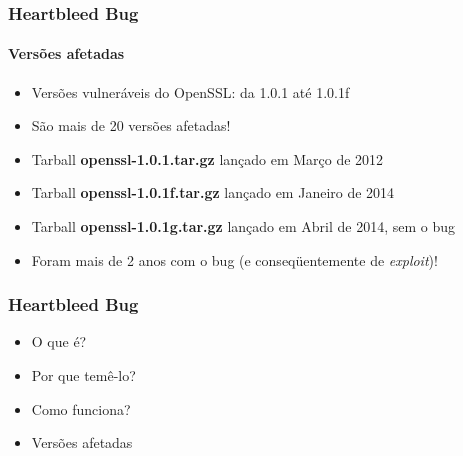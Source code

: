 \documentclass{beamer}
\begin{document}
\begin{frame}
	\frametitle{Heartbleed Bug}
	\framesubtitle{Versões afetadas}
	\begin{itemize}
		\item Versões vulneráveis do OpenSSL: da 1.0.1 até 1.0.1f
		\item São mais de 20 versões afetadas!
		\item Tarball \textbf{\textcolor{filecolor}{openssl-1.0.1.tar.gz}} lançado em Março de 2012
		\item Tarball \textbf{\textcolor{filecolor}{openssl-1.0.1f.tar.gz}} lançado em Janeiro de 2014
		\item Tarball \textbf{\textcolor{filecolor}{openssl-1.0.1g.tar.gz}} lançado em Abril de 2014, sem o bug
		\item Foram mais de 2 anos com o bug (e conseqüentemente de \textit{exploit})!
	\end{itemize}
\end{frame}

\begin{frame}
	\frametitle{Heartbleed Bug}
	\begin{itemize}
		\item \textcolor{covered}{O que é?}
		\item \textcolor{covered}{Por que temê-lo?}
		\item \textcolor{covered}{Como funciona?}
		\item \textcolor{covered}{Versões afetadas}
	\end{itemize}
\end{frame}
\end{document}
